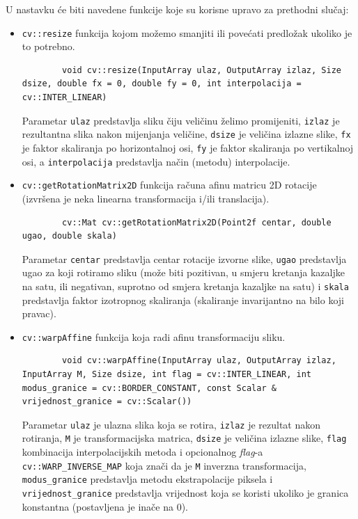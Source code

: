 \documentclass[a4paper, 12pt]{article}
\begin{document}
U nastavku će biti navedene funkcije koje su korisne upravo za prethodni slučaj:

\begin{itemize}
    \item \lstinline{cv::resize} funkcija kojom možemo smanjiti ili povećati predložak ukoliko je to potrebno.
    \begin{lstlisting}
        void cv::resize(InputArray ulaz, OutputArray izlaz, Size dsize, double fx = 0, double fy = 0, int interpolacija = cv::INTER_LINEAR)
    \end{lstlisting}
    Parametar \lstinline{ulaz} predstavlja sliku čiju veličinu želimo promijeniti, \lstinline{izlaz} je rezultantna slika nakon mijenjanja veličine, \lstinline{dsize} je veličina izlazne slike, \lstinline{fx} je faktor skaliranja po horizontalnoj osi, \lstinline{fy} je faktor skaliranja po vertikalnoj osi, a \lstinline{interpolacija} predstavlja način (metodu) interpolacije.
    \item \lstinline{cv::getRotationMatrix2D} funkcija računa afinu matricu 2D rotacije (izvršena je neka linearna transformacija i/ili translacija). 
    \begin{lstlisting}
        cv::Mat cv::getRotationMatrix2D(Point2f centar, double ugao, double skala)
    \end{lstlisting}
    Parametar \lstinline{centar} predstavlja centar rotacije izvorne slike, \lstinline{ugao} predstavlja ugao za koji rotiramo sliku (može biti pozitivan, u smjeru kretanja kazaljke na satu, ili negativan, suprotno od smjera kretanja kazaljke na satu) i \lstinline{skala} predstavlja faktor izotropnog skaliranja (skaliranje invarijantno na bilo koji pravac).
    \item \lstinline{cv::warpAffine} funkcija koja radi afinu transformaciju sliku.
    \begin{lstlisting}
        void cv::warpAffine(InputArray ulaz, OutputArray izlaz, InputArray M, Size dsize, int flag = cv::INTER_LINEAR, int modus_granice = cv::BORDER_CONSTANT, const Scalar & vrijednost_granice = cv::Scalar())
    \end{lstlisting}
    Parametar \lstinline{ulaz} je ulazna slika koja se rotira, \lstinline{izlaz} je rezultat nakon rotiranja, \lstinline{M} je transformacijska matrica, \lstinline{dsize} je veličina izlazne slike, \lstinline{flag} kombinacija interpolacijskih metoda i opcionalnog \textit{flag}-a \lstinline{cv::WARP_INVERSE_MAP} koja znači da je \lstinline{M} inverzna transformacija, \lstinline{modus_granice} predstavlja metodu ekstrapolacije piksela i \lstinline{vrijednost_granice} predstavlja vrijednost koja se koristi ukoliko je granica konstantna (postavljena je inače na 0).
\end{itemize}
\end{document}

